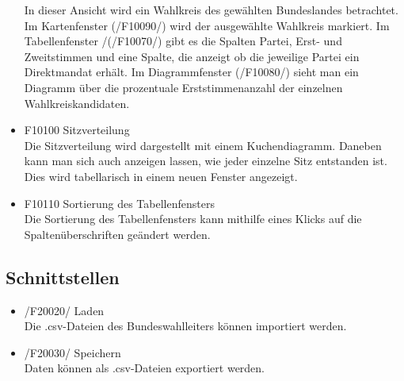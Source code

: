 \documentclass[10pt,a4paper]{article}
\begin{document}
\begin{itemize}
	In dieser Ansicht wird ein Wahlkreis des gewählten Bundeslandes betrachtet. Im Kartenfenster (/F10090/) wird der ausgewählte Wahlkreis markiert. Im Tabellenfenster /(/F10070/) gibt es die  Spalten Partei, Erst- und Zweitstimmen und eine Spalte, die anzeigt ob die jeweilige Partei ein Direktmandat erhält. Im Diagrammfenster (/F10080/) sieht man ein Diagramm über die prozentuale Erststimmenanzahl der einzelnen Wahlkreiskandidaten. 
	\item F10100 Sitzverteilung \hfill \\
	Die Sitzverteilung wird dargestellt mit einem Kuchendiagramm. Daneben kann man sich auch anzeigen lassen, wie jeder einzelne Sitz entstanden ist. Dies wird tabellarisch in einem neuen Fenster angezeigt.
	\item F10110 Sortierung des Tabellenfensters \hfill \\
	Die Sortierung des Tabellenfensters kann mithilfe eines Klicks auf die Spaltenüberschriften geändert werden.
\end{itemize}

\subsection{Schnittstellen}
\begin{itemize}
	\item /F20020/ Laden \hfill \\
	Die .csv-Dateien des Bundeswahlleiters können importiert werden.
	\item /F20030/ Speichern \hfill \\
	Daten können als .csv-Dateien exportiert werden.
	

\end{itemize}
\end{document}
